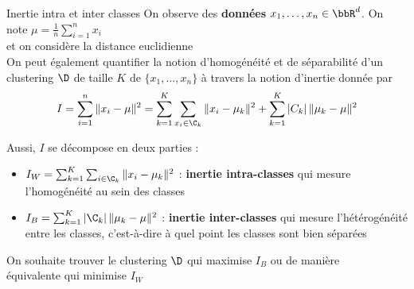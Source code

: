 \documentclass[10pt]{beamer}
\newcommand{\hsp}{\hspace*{1em}}
\begin{document}
\begin{frame}{Inertie intra et inter classes}
		\vspace{-0.5em}
	 \hsp On observe des \textbf{données} $x_1,\dots,x_n \in \bbR^d$. On note $\mu = \frac{1}{n} \sum_{i=1}^n x_i$\\[-0.1em]
	\phantom{\bftitle{Contexte} \hsp} et on considère la distance euclidienne\\[1.5em]
	
On peut également quantifier la notion d'homogénéité et de séparabilité d'un clustering $\D$ de taille $K$ de $\{x_1,\dots,x_n\}$ à travers la notion d'inertie donnée par 
	\vspace{-0.5em}
	$$ I = \sum_{i =1}^n \| x_i - \mu \|^2 = \sum_{k =1}^K \sum_{x_i \in \C_k} \|x_i - \mu_k \|^2  + \sum_{k =1}^K \vert C_k \vert \, \| \mu_k - \mu \|^2$$
	
Aussi, $I$ se décompose en deux parties :\\[0.5em]
\begin{itemize}
	\item $I_W = \sum_{k =1}^K \sum_{i \in \C_k} \|x_i - \mu_k \|^2 $  : \textbf{inertie intra-classes} qui mesure l'homogénéité au sein des classes\\[0.5em]
	\item $I_B = \sum_{k =1}^K \vert \C_k \vert \, \| \mu_k - \mu \|^2$ : \textbf{inertie inter-classes} qui mesure l'hétérogénéité entre les classes, c'est-à-dire à quel point les classes sont bien séparées\\[1.5em]
\end{itemize}	

 \hsp On souhaite trouver le clustering $\D$ qui maximise $I_B$ ou de manière\\
\phantom{\bftitle{Objectif} \hsp} équivalente qui minimise $I_W$
	

\end{frame}
\end{document}
